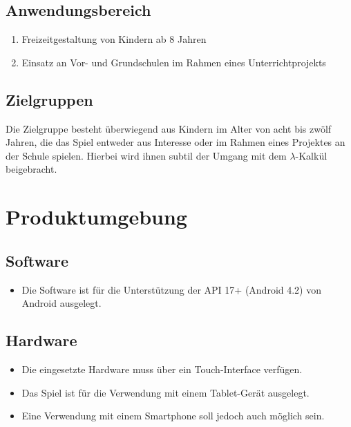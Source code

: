 \documentclass{scrartcl}
\begin{document}
\subsection{Anwendungsbereich}

\begin{enumerate}
	\item Freizeitgestaltung von Kindern ab 8 Jahren
	\item Einsatz an Vor- und Grundschulen im Rahmen eines Unterrichtprojekts
\end{enumerate}

\subsection{Zielgruppen}

Die Zielgruppe besteht überwiegend aus Kindern im Alter von acht bis zwölf Jahren, die das Spiel entweder aus Interesse oder im Rahmen eines Projektes an der Schule spielen. Hierbei wird ihnen subtil der Umgang mit dem $\lambda$-Kalkül beigebracht.

\clearpage








\section{Produktumgebung}

\subsection{Software}

\begin{itemize}
	\item Die Software ist für die Unterstützung der API 17+ (Android 4.2) von Android ausgelegt.
\end{itemize}

\subsection{Hardware}

\begin{itemize}
	\item Die eingesetzte Hardware muss über ein Touch-Interface verfügen.
	\item Das Spiel ist für die Verwendung mit einem Tablet-Gerät ausgelegt.
	\item Eine Verwendung mit einem Smartphone soll jedoch auch möglich sein.
\end{itemize}
\end{document}
